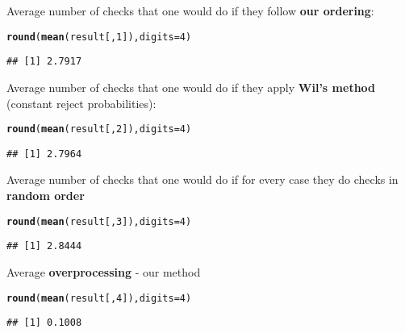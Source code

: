\documentclass{article}\usepackage[]{graphicx}\usepackage[]{color}
\makeatletter
\newcommand{\hlnum}[1]{\textcolor[rgb]{0.686,0.059,0.569}{#1}}%
\newcommand{\hlstd}[1]{\textcolor[rgb]{0.345,0.345,0.345}{#1}}%
\newcommand{\hlkwc}[1]{\textcolor[rgb]{0.333,0.667,0.333}{#1}}%
\newcommand{\hlkwd}[1]{\textcolor[rgb]{0.737,0.353,0.396}{\textbf{#1}}}%
\newenvironment{kframe}{%
 \def\at@end@of@kframe{}%
 \ifinner\ifhmode%
  \def\at@end@of@kframe{\end{minipage}}%
  \begin{minipage}{\columnwidth}%
 \fi\fi%
 \def\FrameCommand##1{\hskip\@totalleftmargin \hskip-\fboxsep
 \colorbox{shadecolor}{##1}\hskip-\fboxsep
     \hskip-\linewidth \hskip-\@totalleftmargin \hskip\columnwidth}%
 \MakeFramed {\advance\hsize-\width
   \@totalleftmargin\z@ \linewidth\hsize
   \@setminipage}}%
 {\par\unskip\endMakeFramed%
 \at@end@of@kframe}
\newenvironment{knitrout}{}{} %
\makeatother
\begin{document}
Average number of checks that one would do if they follow \textbf{our ordering}:

\begin{knitrout}
\color{fgcolor}\begin{kframe}
\begin{alltt}
\hlkwd{round}\hlstd{(}\hlkwd{mean}\hlstd{(result[,}\hlnum{1}\hlstd{]),}\hlkwc{digits} \hlstd{=} \hlnum{4}\hlstd{)}
\end{alltt}
\begin{verbatim}
## [1] 2.7917
\end{verbatim}
\end{kframe}
\end{knitrout}

Average number of checks that one would do if they apply \textbf{Wil's method} (constant reject probabilities):

\begin{knitrout}
\color{fgcolor}\begin{kframe}
\begin{alltt}
\hlkwd{round}\hlstd{(}\hlkwd{mean}\hlstd{(result[,}\hlnum{2}\hlstd{]),}\hlkwc{digits} \hlstd{=} \hlnum{4}\hlstd{)}
\end{alltt}
\begin{verbatim}
## [1] 2.7964
\end{verbatim}
\end{kframe}
\end{knitrout}

Average number of checks that one would do if for every case they do checks in \textbf{random order}

\begin{knitrout}
\color{fgcolor}\begin{kframe}
\begin{alltt}
\hlkwd{round}\hlstd{(}\hlkwd{mean}\hlstd{(result[,}\hlnum{3}\hlstd{]),}\hlkwc{digits} \hlstd{=} \hlnum{4}\hlstd{)}
\end{alltt}
\begin{verbatim}
## [1] 2.8444
\end{verbatim}
\end{kframe}
\end{knitrout}

Average \textbf{overprocessing} - our method

\begin{knitrout}
\color{fgcolor}\begin{kframe}
\begin{alltt}
\hlkwd{round}\hlstd{(}\hlkwd{mean}\hlstd{(result[,}\hlnum{4}\hlstd{]),}\hlkwc{digits} \hlstd{=} \hlnum{4}\hlstd{)}
\end{alltt}
\begin{verbatim}
## [1] 0.1008
\end{verbatim}
\end{kframe}
\end{knitrout}
\end{document}
